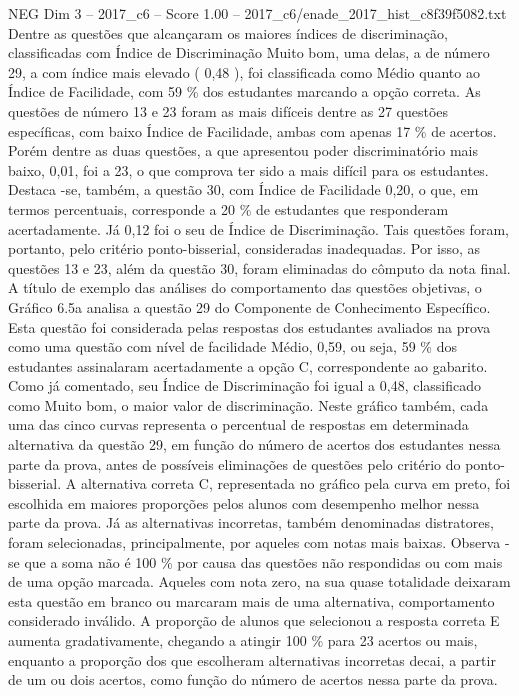 \begin{textsample}{NEG Dim 3 – 2017\_c6 – Score 1.00 – 2017\_c6/enade\_2017\_hist\_c8f39f5082.txt}
Dentre as questões que alcançaram os maiores índices de discriminação, classificadas com Índice de Discriminação Muito bom, uma delas, a de número 29, a com índice mais elevado ( 0,48 ), foi classificada como Médio quanto ao Índice de Facilidade, com 59 \% dos estudantes marcando a opção correta.
As questões de número 13 e 23 foram as mais difíceis dentre as 27 questões específicas, com baixo Índice de Facilidade, ambas com apenas 17 \% de acertos.
Porém dentre as duas questões, a que apresentou poder discriminatório mais baixo, 0,01, foi a 23, o que comprova ter sido a mais difícil para os estudantes.
Destaca -se, também, a questão 30, com Índice de Facilidade 0,20, o que, em termos percentuais, corresponde a 20 \% de estudantes que responderam acertadamente.
Já 0,12 foi o seu de Índice de Discriminação.
Tais questões foram, portanto, pelo critério ponto-bisserial, consideradas inadequadas.
Por isso, as questões 13 e 23, além da questão 30, foram eliminadas do cômputo da nota final.
A título de exemplo das análises do comportamento das questões objetivas, o Gráfico 6.5a analisa a questão 29 do Componente de Conhecimento Específico.
Esta questão foi considerada pelas respostas dos estudantes avaliados na prova como uma questão com nível de facilidade Médio, 0,59, ou seja, 59 \% dos estudantes assinalaram acertadamente a opção C, correspondente ao gabarito.
Como já comentado, seu Índice de Discriminação foi igual a 0,48, classificado como Muito bom, o maior valor de discriminação.
Neste gráfico também, cada uma das cinco curvas representa o percentual de respostas em determinada alternativa da questão 29, em função do número de acertos dos estudantes nessa parte da prova, antes de possíveis eliminações de questões pelo critério do ponto-bisserial.
A alternativa correta C, representada no gráfico pela curva em preto, foi escolhida em maiores proporções pelos alunos com desempenho melhor nessa parte da prova.
Já as alternativas incorretas, também denominadas distratores, foram selecionadas, principalmente, por aqueles com notas mais baixas.
Observa -se que a soma não é 100 \% por causa das questões não respondidas ou com mais de uma opção marcada.
Aqueles com nota zero, na sua quase totalidade deixaram esta questão em branco ou marcaram mais de uma alternativa, comportamento considerado inválido.
A proporção de alunos que selecionou a resposta correta E aumenta gradativamente, chegando a atingir 100 \% para 23 acertos ou mais, enquanto a proporção dos que escolheram alternativas incorretas decai, a partir de um ou dois acertos, como função do número de acertos nessa parte da prova.

\end{textsample}
